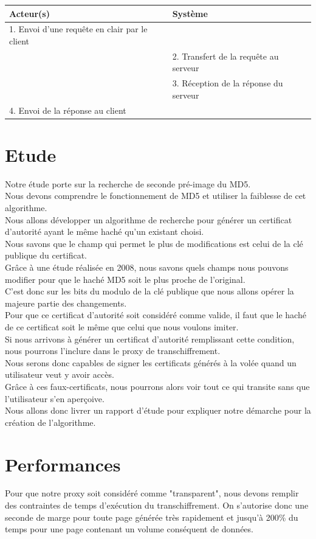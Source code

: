 \documentclass[a4paper,11pt,french]{article}
\begin{document}
\begin{tabular}{|m{8cm}|m{8cm}|}
   \hline
  \rowcolor[gray]{.8} Acteur(s) & Système \\
   \hline
   1. Envoi d'une requête en clair par le client & \\
   \hline
& 2. Transfert de la requête au serveur  \\
& 3. Réception de la réponse du serveur  \\
   \hline
  
4. Envoi de la réponse au client  &  \\
   \hline
\end{tabular}

\section{Etude}

Notre étude porte sur la recherche de seconde pré-image du MD5.\\
Nous devons comprendre le fonctionnement de MD5 et utiliser la faiblesse de cet algorithme.\\
Nous allons développer un algorithme de recherche pour générer un certificat d'autorité ayant le même haché qu'un existant choisi.\\
Nous savons que le champ qui permet le plus de modifications est celui de la clé publique du certificat.\\
Grâce à une étude réalisée en 2008, nous savons quels champs nous pouvons modifier pour que le haché MD5 soit le plus proche de l'original.\\
C'est donc sur les bits du modulo de la clé publique que nous allons opérer la majeure partie des changements.\\
Pour que ce certificat d'autorité soit considéré comme valide, il faut que le haché de ce certificat soit le même que celui que nous voulons imiter.\\
Si nous arrivons à générer un certificat d'autorité remplissant cette condition, nous pourrons l'inclure dans le proxy de transchiffrement.\\
Nous serons donc capables de signer les certificats générés à la volée quand un utilisateur veut y avoir accès.\\
Grâce à ces faux-certificats, nous pourrons alors voir tout ce qui transite sans que l'utilisateur s'en aperçoive.\\
Nous allons donc livrer un rapport d'étude pour expliquer notre démarche pour la création de l'algorithme.\\

\section{Performances}
Pour que notre proxy soit considéré comme "transparent", nous devons remplir des contraintes de temps d'exécution du transchiffrement.
On s'autorise donc une seconde de marge pour toute page générée très rapidement et jusqu'à 200\% du temps pour une page contenant un volume conséquent de données.
\end{document}
